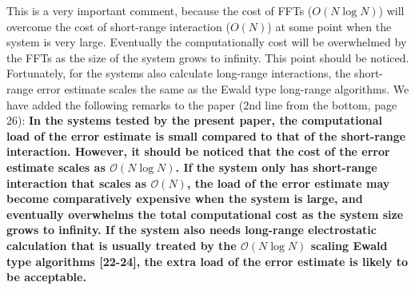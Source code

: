 \documentclass[a4paper]{article}
\begin{document}
This is a very important comment, because
the cost of FFTs ($O(N\log N)$) will overcome the cost of short-range
interaction ($O(N)$) at some point when the system is very
large. Eventually the computationally cost will be overwhelmed by the
FFTs as the size of the system grows to infinity.
This point should be noticed.  Fortunately, for the systems
also calculate long-range interactions, the short-range error estimate
scales the same as the Ewald type long-range algorithms.
We have added the following remarks to the paper
(2nd line from the bottom, page 26):
\textbf{In the systems tested by the present paper, the computational
  load of the error estimate is small compared to that of the
  short-range interaction.
  However, it should be noticed that
  the cost of the error estimate scales as $\mathcal O(N\log N)$.
  If the system only has short-range interaction that
  scales as $\mathcal O(N)$, the load of the error estimate
  may become comparatively expensive when the system is large,
  and eventually
  overwhelms the total computational cost as the
  system size grows to infinity.
  If the system also needs long-range electrostatic calculation
  that is usually treated by the $\mathcal O(N\log N)$ scaling
  Ewald type algorithms [22-24],
  the extra load of the error estimate is likely to be acceptable.
}
\end{document}
